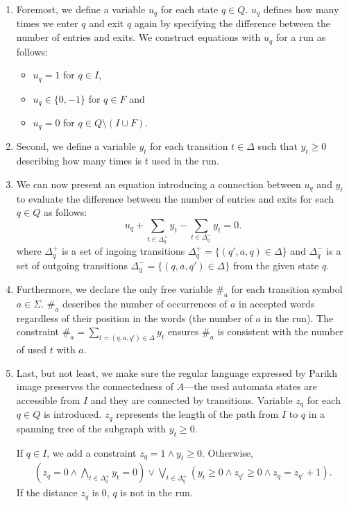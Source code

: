 \begin{enumerate}
    \item \label{clauses:u_original} Foremost, we define a variable $u_{q}$ for each state $q \in Q$. $u_{q}$ defines how many times we enter $q$ and exit $q$ again by specifying the difference between the number of entries and exits. We construct equations with $u_{q}$ for a run as follows:
    \begin{itemize}
        \item $u_{q} = 1$ for $q \in I$,
        \item $u_{q} \in \{ 0, -1 \}$ for $q \in F$ and
        \item $u_{q} = 0$ for $q \in Q \setminus ( I \cup F )$.
    \end{itemize}

    \item \label{clauses:y_original} Second, we define a variable $y_{t}$ for each transition $t \in \Delta$ such that $y_{t} \geq 0$ describing how many times is $t$ used in the run.

    \item \label{clauses:uy_original} We can now present an equation introducing a connection between $u_{q}$ and $y_{t}$ to evaluate the difference between the number of entries and exits for each $q \in Q$ as follows:
    $$ u_q + \sum_{t \in \Delta_q^+} y_t - \sum_{t \in \Delta_q^-} y_t = 0.$$
    where $\Delta_q^+$ is a set of ingoing transitions $ \Delta_q^+ = \{ (q',a,q) \in \Delta \}$ and $\Delta_q^-$ is a set of outgoing transitions $ \Delta_q^- = \{ (q,a,q') \in \Delta \} $ from the given state $q$.

    \item \label{clauses:hash_original} Furthermore, we declare the only free variable $\#_a$ for each transition symbol $ a \in \Sigma$. $\#_a$ describes the number of occurrences of $a$ in accepted words regardless of their position in the words (the number of $a$ in the run). The constraint $\#_a = \sum_{t = (q, a, q') \in \Delta} y_t$ ensures $\#_a$ is consistent with the number of used $t$ with $a$.

    \item \label{clauses:z_original} Last, but not least, we make sure the regular language expressed by Parikh image preserves the connectedness of $A$---the used automata states are accessible from $I$ and they are connected by transitions. Variable $z_q$ for each $q \in Q$ is introduced. $z_q$ represents the length of the path from $I$ to $q$ in a spanning tree of the subgraph with $y_t \geq 0$.

    If $q \in I$, we add a constraint $z_q = 1 \land y_t \geq 0$. Otherwise,
    {
    \begin{align*}
        (z_q = 0 \land \bigwedge_{t \in \Delta_q^+} y_t = 0) \lor \bigvee_{t \in \Delta_q^+} (y_t \geq 0 \land z_{q'} \geq 0 \land z_q = z_{q'} + 1) \text{.}
    \end{align*}
    }
    If the distance $z_q$ is $0$, $q$ is not in the run.
\end{enumerate}

